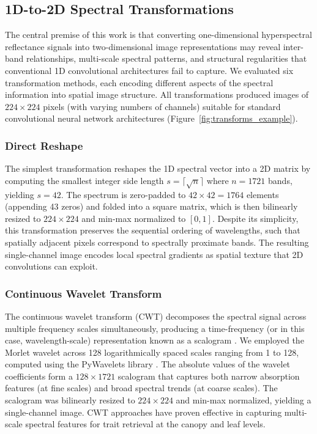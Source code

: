 \subsection{1D-to-2D Spectral Transformations}
\label{sec:transforms}

The central premise of this work is that converting one-dimensional hyperspectral reflectance signals into two-dimensional image representations may reveal inter-band relationships, multi-scale spectral patterns, and structural regularities that conventional 1D convolutional architectures fail to capture. We evaluated six transformation methods, each encoding different aspects of the spectral information into spatial image structure. All transformations produced images of $224 \times 224$ pixels (with varying numbers of channels) suitable for standard convolutional neural network architectures (Figure~\ref{fig:transforms_example}).

\subsubsection{Direct Reshape}

The simplest transformation reshapes the 1D spectral vector into a 2D matrix by computing the smallest integer side length $s = \lceil\sqrt{n}\rceil$ where $n = 1721$ bands, yielding $s = 42$. The spectrum is zero-padded to $42 \times 42 = 1764$ elements (appending 43 zeros) and folded into a square matrix, which is then bilinearly resized to $224 \times 224$ and min-max normalized to $[0, 1]$. Despite its simplicity, this transformation preserves the sequential ordering of wavelengths, such that spatially adjacent pixels correspond to spectrally proximate bands. The resulting single-channel image encodes local spectral gradients as spatial texture that 2D convolutions can exploit.

\subsubsection{Continuous Wavelet Transform}

The continuous wavelet transform (CWT) decomposes the spectral signal across multiple frequency scales simultaneously, producing a time-frequency (or in this case, wavelength-scale) representation known as a scalogram \citep{addison2017wavelet}. We employed the Morlet wavelet across 128 logarithmically spaced scales ranging from 1 to 128, computed using the PyWavelets library \citep{pywt}. The absolute values of the wavelet coefficients form a $128 \times 1721$ scalogram that captures both narrow absorption features (at fine scales) and broad spectral trends (at coarse scales). The scalogram was bilinearly resized to $224 \times 224$ and min-max normalized, yielding a single-channel image. CWT approaches have proven effective in capturing multi-scale spectral features for trait retrieval at the canopy \citep{Blackburn2007-vn} and leaf \citep{Lopatin2023-fn} levels.

